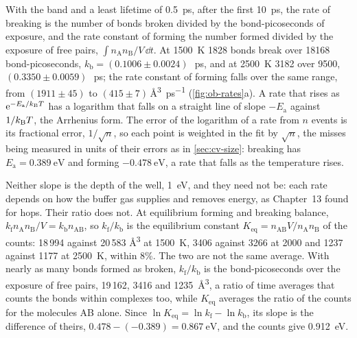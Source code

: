 With the band and a least lifetime of \SI{0.5}{\pico\second}, after the
first \SI{10}{\pico\second}, the rate of breaking is the number of bonds
broken divided by the bond-picoseconds of exposure, and the rate constant
of forming the number formed divided by the exposure of free pairs,
$\int n_{\mathrm A}n_{\mathrm B}/V\,\dd t$. At \SI{1500}{\kelvin} 1828 bonds
break over \num{18168} bond-picoseconds, $k_{\mathrm b} = (0.1006 \pm
0.0024)$\,\si{\per\pico\second}, and at \SI{2500}{\kelvin} 3182 over 9500,
$(0.3350 \pm 0.0059)$\,\si{\per\pico\second}; the rate constant of forming
falls over the same range, from $(1911 \pm 45)$ to $(415 \pm
7)$\,\si{\angstrom\cubed\per\pico\second} (\cref{fig:ob-rates}a). A rate
that rises as $\mathrm{e}^{-E_{\mathrm a}/k_{\mathrm{B}} T}$ has a logarithm that
falls on a straight line of slope $-E_{\mathrm a}$ against $1/k_{\mathrm{B}} T$, the
Arrhenius form. The error of the logarithm of a rate from $n$ events is
its fractional error, $1/\sqrt n$, so each point is weighted in the fit
by $\sqrt n$, the misses being measured in units of their errors as in
\cref{sec:cv-size}: breaking has $E_{\mathrm a} = \SI{0.389}{\electronvolt}$
and forming $-\SI{0.478}{\electronvolt}$, a rate that falls as the
temperature rises.

Neither slope is the depth of the well, \SI{1}{\electronvolt}, and they
need not be: each rate depends on how the buffer gas supplies and removes
energy, as Chapter~13 found for hops. Their ratio does not. At
equilibrium forming and breaking balance, $k_{\mathrm f}n_{\mathrm A}
n_{\mathrm B}/V = k_{\mathrm b}n_{\mathrm{AB}}$, so $k_{\mathrm f}/k_{\mathrm
b}$ is the equilibrium constant $K_{\mathrm{eq}} = n_{\mathrm{AB}}V/n_{\mathrm
A}n_{\mathrm B}$ of the counts: 18\,994 against 20\,583
\si{\angstrom\cubed} at \SI{1500}{\kelvin}, 3406 against 3266 at 2000 and
1237 against 1177 at \SI{2500}{\kelvin}, within 8\%. The two are not
the same average. With nearly as many bonds formed as broken,
$k_{\mathrm f}/k_{\mathrm b}$ is the bond-picoseconds over the exposure of
free pairs, 19\,162, 3416 and \SI{1235}{\angstrom\cubed}, a ratio of time
averages that counts the bonds within complexes too, while $K_{\mathrm{eq}}$
averages the ratio of the counts for the molecules AB alone. Since
$\ln K_{\mathrm{eq}} = \ln k_{\mathrm f} - \ln k_{\mathrm b}$, its slope is the
difference of theirs, $0.478 - (-0.389) = \SI{0.867}{\electronvolt}$, and
the counts give \SI{0.912}{\electronvolt}.

